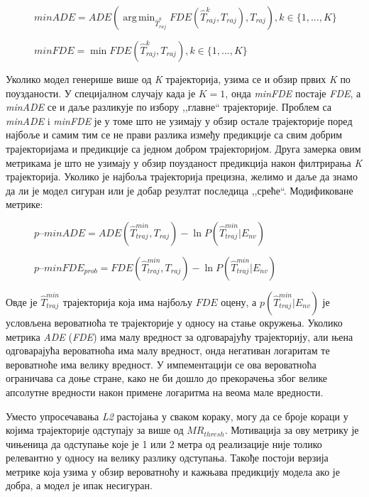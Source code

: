\documentclass[11pt,oneside]{memoir}
\DeclareMathOperator*{\argmin}{arg\,min}
\begin{document}
\begin{figure}[h!]
  \centering
  $minADE = ADE(\displaystyle\argmin_{\hat{T}^k_{raj}} FDE(\hat{T}^k_{raj}, T_{raj}), T_{raj}), k \in \{1, ..., K\}$ 
\end{figure}

\begin{figure}[h!]
  \centering
  $minFDE = \displaystyle\min FDE(\hat{T}^k_{raj}, T_{raj}), k \in \{1, ..., K\}$
\end{figure}

Уколико модел генерише више од \textit{K} трајекторија, узима се и обзир првих \textit{K} по поузданости. У специјалном случају када је $K = 1$, онда 
\textit{minFDE} постаје \textit{FDE}, а \textit{minADE} се и даље разликује по избору ,,главне`` трајекторије. 
Проблем са \textit{minADE} i \textit{minFDE} је у томе што не узимају у обзир остале трајекторије поред најбоље и самим тим се не прави разлика
између предикције са свим добрим трајекторијама и предикције са једном добром трајекторијом. \cite{Disdis} 
Друга замерка овим метрикама је што не узимају у обзир поузданост предикција након филтрирања \textit{K} трајекторија. Уколико је најбоља трајекторија
прецизна, желимо и даље да знамо да ли је модел сигуран или је добар резултат последица ,,среће``. Модификоване метрике: \cite{home}

\begin{figure}[h!]
  \centering
  $p\mbox{--}minADE = ADE(\hat{T}^{min}_{traj}, T_{raj}) - \ln{P(\hat{T}^{min}_{traj}|E_{nv})}$
\end{figure}

\begin{figure}[h!]
  \centering
  $p\mbox{--}minFDE_{prob} = FDE(\hat{T}^{min}_{traj}, T_{raj}) - \ln{P(\hat{T}^{min}_{traj}|E_{nv})}$
\end{figure}

Овде је $\hat{T}^{min}_{traj}$ трајекторија која има најбољу $FDE$ оцену, а $p(\hat{T}^{min}_{traj}|E_{nv})$ је условљена вероватноћа те 
трајекторије у односу на стање окружења. Уколико метрика \textit{ADE} (\textit{FDE}) има малу вредност за одговарајућу трајекторију, али њена одговарајућа вероватноћа има малу вредност, 
онда негативан логаритам те вероватноће има велику вредност. \cite{argoverse} У импементацији се ова вероватноћа ограничава са доње стране, како не
би дошло до прекорачења због велике апсолутне вредности након примене логаритма на веома мале вредности.

Уместо упросечавања \textit{L2} растојања у сваком кораку, могу да се броје кораци у којима трајекторије одступају за више од $MR_{thresh}$. 
Мотивација за ову метрику је чињеница да одступање које је 1 или 2 метра од реализације није толико релевантно у односу на 
велику разлику одступања. \cite{home} Такође постоји верзија метрике која узима у обзир вероватноћу и кажњава предикцију 
модела ако је добра, а модел је ипак несигуран.
\end{document}
